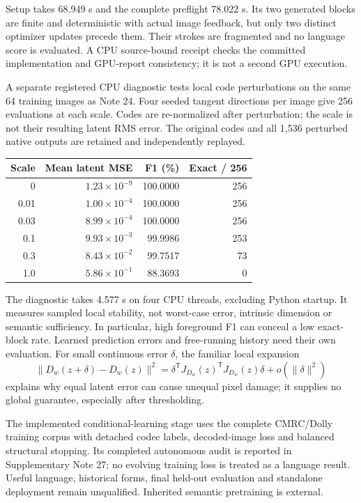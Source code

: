 \documentclass[10pt,a4paper]{article}
\begin{document}
Setup takes 68.949 s and the complete preflight 78.022 s. Its two generated
blocks are finite and deterministic with actual image feedback, but only two
distinct optimizer updates precede them. Their strokes are fragmented and no
language score is evaluated. A CPU source-bound receipt checks the committed
implementation and GPU-report consistency; it is not a second GPU execution.

A separate registered CPU diagnostic tests local code perturbations on the
same 64 training images as Note 24. Four seeded tangent directions per image
give 256 evaluations at each scale. Codes are re-normalized after perturbation;
the scale is not their resulting latent RMS error. The original codes and
all 1,536 perturbed native outputs are retained and independently replayed.
\begin{center}\small
\begin{tabular}{rrrr}\toprule
Scale & Mean latent MSE & F1 (\%) & Exact / 256\\\midrule
0 & $1.23\times10^{-9}$ & 100.0000 & 256\\
0.01 & $1.00\times10^{-4}$ & 100.0000 & 256\\
0.03 & $8.99\times10^{-4}$ & 100.0000 & 256\\
0.1 & $9.93\times10^{-3}$ & 99.9986 & 253\\
0.3 & $8.43\times10^{-2}$ & 99.7517 & 73\\
1.0 & $5.86\times10^{-1}$ & 88.3693 & 0\\\bottomrule
\end{tabular}
\end{center}
The diagnostic takes 4.577 s on four CPU threads, excluding Python startup.
It measures sampled local stability, not worst-case error, intrinsic dimension
or semantic sufficiency. In particular, high foreground F1 can conceal a low
exact-block rate. Learned prediction errors and free-running history need
their own evaluation. For small continuous error $\delta$, the familiar local
expansion
\begin{equation}
 \|D_w(z+\delta)-D_w(z)\|^2
 =\delta^{\mathsf T}J_{D_w}(z)^{\mathsf T}J_{D_w}(z)\delta
 +o(\|\delta\|^2)
\end{equation}
explains why equal latent error can cause unequal pixel damage; it supplies
no global guarantee, especially after thresholding.

The implemented conditional-learning stage uses the complete CMRC/Dolly
training corpus with detached codec labels, decoded-image loss and balanced
structural stopping. Its completed autonomous audit is reported in
Supplementary Note 27; no evolving training loss is treated as a language
result. Useful language, historical forms, final held-out evaluation and
standalone deployment remain unqualified. Inherited semantic pretraining is
external.
\end{document}
